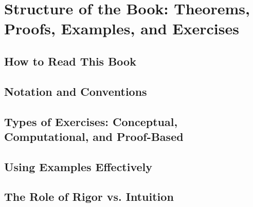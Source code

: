 \chapter{Structure of the Book: Theorems, Proofs, Examples, and Exercises}
\section{How to Read This Book}
\section{Notation and Conventions}
\section{Types of Exercises: Conceptual, Computational, and Proof-Based}
\section{Using Examples Effectively}
\section{The Role of Rigor vs. Intuition}